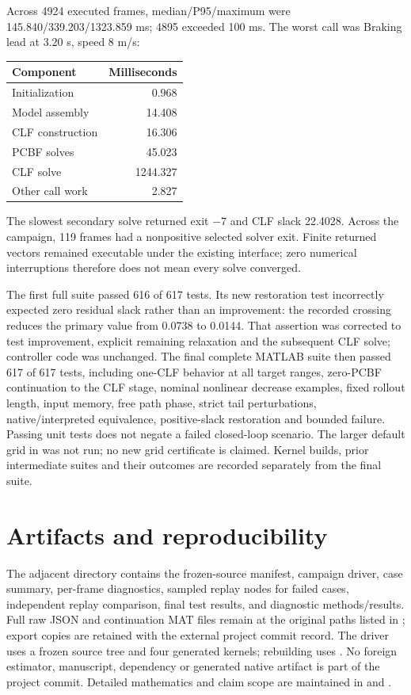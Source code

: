 \documentclass[11pt]{article}
\begin{document}
Across 4924 executed frames, median/P95/maximum were
145.840/339.203/1323.859 ms; 4895 exceeded 100 ms.
The worst call was Braking lead at 3.20 s, speed 8 m/s:
\begin{center}\begin{tabular}{lr}\toprule
Component & Milliseconds\\\midrule
Initialization & 0.968 \\
Model assembly & 14.408 \\
CLF construction & 16.306 \\
PCBF solves & 45.023 \\
CLF solve & 1244.327 \\
Other call work & 2.827 \\
\bottomrule\end{tabular}\end{center}
The slowest secondary solve returned exit $-7$ and CLF slack 22.4028.
Across the campaign, 119 frames had a nonpositive selected solver exit.
Finite returned vectors remained executable under the existing interface;
zero numerical interruptions therefore does not mean every solve converged.

The first full suite passed 616 of 617 tests. Its new restoration test
incorrectly expected zero residual slack rather than an improvement: the
recorded crossing reduces the primary value from 0.0738 to 0.0144. That
assertion was corrected to test improvement, explicit remaining relaxation
and the subsequent CLF solve; controller code was unchanged. The final
complete MATLAB suite then passed 617 of 617 tests, including
one-CLF behavior at all target ranges, zero-PCBF continuation to the CLF stage,
nominal nonlinear decrease examples, fixed rollout length, input memory, free path phase,
strict tail perturbations, native/interpreted equivalence, positive-slack
restoration and bounded failure. Passing unit tests does not negate a failed
closed-loop scenario. The larger default grid in
 was not run; no new grid certificate is
claimed. Kernel builds, prior intermediate suites and their outcomes are
recorded separately from the final suite.

\section{Artifacts and reproducibility}
The adjacent directory contains the frozen-source manifest, campaign driver,
case summary, per-frame diagnostics, sampled replay nodes for failed cases, independent
replay comparison, final test results, and diagnostic methods/results.
Full raw JSON and continuation MAT files remain at the original paths listed
in ; export copies are retained with the external
project commit record. The driver uses a frozen source tree and four generated
kernels; rebuilding uses . No foreign
estimator, manuscript, dependency or generated native artifact is part of the
project commit. Detailed mathematics and claim scope are maintained in
 and
.
\end{document}
